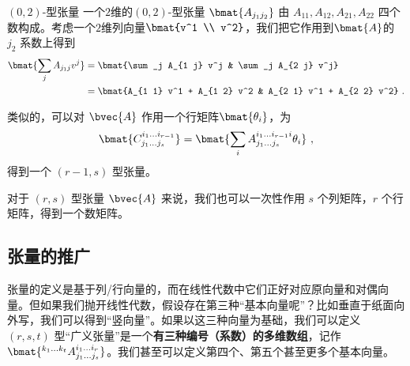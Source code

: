 \begin{example}{$(0, 2)$-型张量}
一个$2$维的$(0, 2)$-型张量 $\bmat{A_{j_1 j_2}}$ 由 $A_{1 1}, A_{1 2}, A_{2 1}, A_{2 2}$ 四个数构成。考虑一个$2$维列向量$\bmat{v^1 \\ v^2}$，我们把它作用到$\bmat{A}$的 $j_2$ 系数上得到
\begin{equation}
\begin{aligned}
\bmat{\sum_j A_{j_1 j} v^j} &= \bmat{\sum_j A_{1 j} v^j & \sum_j A_{2 j} v^j} \\
&= \bmat{A_{1 1} v^1 + A_{1 2} v^2 & A_{2 1} v^1 + A_{2 2} v^2}~.
\end{aligned}
\end{equation}
\end{example}

类似的，可以对 $\bvec{A}$ 作用一个行矩阵$\bmat{\theta_i}$，为
\begin{equation}
\bmat{C_{j_1 \dots j_s}^{i_1 \dots i_{r - 1}}} = \bmat{\sum_i A_{j_1 \dots j_s}^{i_1 \dots i_{r - 1} i} \theta_i}~,
\end{equation}
得到一个 $(r - 1,s)$ 型张量。

对于 $(r, s)$ 型张量 $\bvec{A}$ 来说，我们也可以一次性作用 $s$ 个列矩阵，$r$ 个行矩阵，得到一个数矩阵。


\subsection{张量的推广}

张量的定义是基于列/行向量的，而在线性代数中它们正好对应原向量和对偶向量。但如果我们抛开线性代数，假设存在第三种“基本向量呢”？比如垂直于纸面向外写，我们可以得到“竖向量”。如果以这三种向量为基础，我们可以定义 $(r, s, t)$ 型“广义张量”是一个\textbf{有三种编号（系数）的多维数组}，记作 $\bmat{{}^{k_1 \dots k_t}A_{j_1 \dots j_s}^{i_1 \dots i_r}}$。我们甚至可以定义第四个、第五个甚至更多个基本向量。
